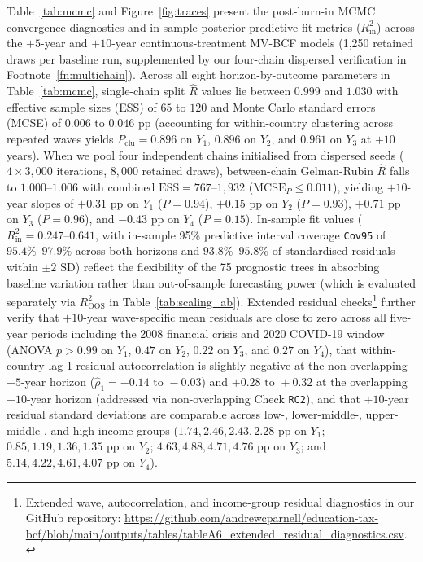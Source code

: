 \documentclass[11pt,a4paper]{article}
\begin{document}
Table~\ref{tab:mcmc} and Figure~\ref{fig:traces} present the post-burn-in MCMC convergence diagnostics and in-sample posterior predictive fit metrics ($R^2_{\text{in}}$) across the $+5$-year and $+10$-year continuous-treatment MV-BCF models (1,250 retained draws per baseline run, supplemented by our four-chain dispersed verification in Footnote~\ref{fn:multichain}). Across all eight horizon-by-outcome parameters in Table~\ref{tab:mcmc}, single-chain split $\hat{R}$ values lie between $0.999$ and $1.030$ with effective sample sizes (ESS) of $65$ to $120$ and Monte Carlo standard errors (MCSE) of $0.006$ to $0.046$ pp (accounting for within-country clustering across repeated waves yields $P_{\text{clu}} = 0.896$ on $Y_1$, $0.896$ on $Y_2$, and $0.961$ on $Y_3$ at $+10$ years). When we pool four independent chains initialised from dispersed seeds ($4 \times 3,000$ iterations, $8,000$ retained draws), between-chain Gelman-Rubin $\hat{R}$ falls to $1.000\text{--}1.006$ with combined $\text{ESS} = 767\text{--}1,932$ ($\text{MCSE}_P \le 0.011$), yielding $+10$-year slopes of $+0.31$ pp on $Y_1$ ($P = 0.94$), $+0.15$ pp on $Y_2$ ($P = 0.93$), $+0.71$ pp on $Y_3$ ($P = 0.96$), and $-0.43$ pp on $Y_4$ ($P = 0.15$). In-sample fit values ($R^2_{\text{in}} = 0.247\text{--}0.641$, with in-sample 95\% predictive interval coverage \texttt{Cov95} of $95.4\%\text{--}97.9\%$ across both horizons and $93.8\%\text{--}95.8\%$ of standardised residuals within $\pm 2\text{ SD}$) reflect the flexibility of the 75 prognostic trees in absorbing baseline variation rather than out-of-sample forecasting power (which is evaluated separately via $R^2_{\text{OOS}}$ in Table~\ref{tab:scaling_ab}). Extended residual checks\footnote{\raggedright Extended wave, autocorrelation, and income-group residual diagnostics in our GitHub repository: \url{https://github.com/andrewcparnell/education-tax-bcf/blob/main/outputs/tables/tableA6_extended_residual_diagnostics.csv}.} further verify that $+10$-year wave-specific mean residuals are close to zero across all five-year periods including the 2008 financial crisis and 2020 COVID-19 window (ANOVA $p > 0.99$ on $Y_1$, $0.47$ on $Y_2$, $0.22$ on $Y_3$, and $0.27$ on $Y_4$), that within-country lag-1 residual autocorrelation is slightly negative at the non-overlapping $+5$-year horizon ($\hat{\rho}_1 = -0.14\text{ to }-0.03$) and $+0.28\text{ to }+0.32$ at the overlapping $+10$-year horizon (addressed via non-overlapping Check \texttt{RC2}), and that $+10$-year residual standard deviations are comparable across low-, lower-middle-, upper-middle-, and high-income groups ($1.74, 2.46, 2.43, 2.28$ pp on $Y_1$; $0.85, 1.19, 1.36, 1.35$ pp on $Y_2$; $4.63, 4.88, 4.71, 4.76$ pp on $Y_3$; and $5.14, 4.22, 4.61, 4.07$ pp on $Y_4$).
\end{document}
